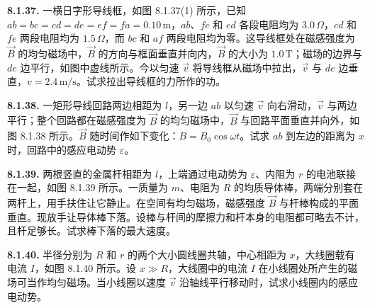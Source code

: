 \vfill
\newpage

\textbf{8.1.37.} 一横日字形导线框，如图 8.1.37(1) 所示，已知 $ab = bc = cd = de = ef = fa = 0.10\,\mathrm{m}$，$ab$、$fc$ 和 $ed$ 各段电阻均为 $3.0\,\Omega$，$cd$ 和 $fe$ 两段电阻均为 $1.5\,\Omega$，而 $bc$ 和 $af$ 两段电阻均为零。这导线框处在磁感强度为 $\vec{B}$ 的均匀磁场中，$\vec{B}$ 的方向与框面垂直并向内，$\vec{B}$ 的大小为 $1.0\,\mathrm{T}$；磁场的边界与 $de$ 边平行，如图中虚线所示。今以匀速 $\vec{v}$ 将导线框从磁场中拉出，$\vec{v}$ 与 $de$ 边垂直，$v = 2.4\,\mathrm{m/s}$。试求拉出导线框的力所作的功。

\begin{center}
\end{center}

\vfill
\newpage

\textbf{8.1.38.} 一矩形导线回路两边相距为 $l$，另一边 $ab$ 以匀速 $\vec{v}$ 向右滑动，$\vec{v}$ 与两边平行；整个回路都在磁感强度为 $\vec{B}$ 的均匀磁场中，$\vec{B}$ 与回路平面垂直并向外，如图 8.1.38 所示。$\vec{B}$ 随时间作如下变化：$B = B_0\cos\omega t$。试求 $ab$ 到左边的距离为 $x$ 时，回路中的感应电动势 $\varepsilon$。

\begin{center}
\end{center}

\vfill
\newpage

\textbf{8.1.39.} 两根竖直的金属杆相距为 $l$，上端通过电动势为 $\varepsilon$、内阻为 $r$ 的电池联接在一起，如图 8.1.39 所示。一质量为 $m$、电阻为 $R$ 的均质导体棒，两端分别套在两杆上，用手扶住让它静止。在空间有均匀磁场，磁感强度 $\vec{B}$ 与杆棒构成的平面垂直。现放手让导体棒下落。设棒与杆间的摩擦力和杆本身的电阻都可略去不计，且杆足够长。试求棒下落的最大速度。

\begin{center}
\end{center}

\vfill
\newpage

\textbf{8.1.40.} 半径分别为 $R$ 和 $r$ 的两个大小圆线圈共轴，中心相距为 $x$，大线圈载有电流 $I$，如图 8.1.40 所示。设 $x \gg R$，大线圈中的电流 $I$ 在小线圈处所产生的磁场可当作均匀磁场。当小线圈以速度 $\vec{v}$ 沿轴线平行移动时，试求小线圈内的感应电动势。

\begin{center}
\end{center}

